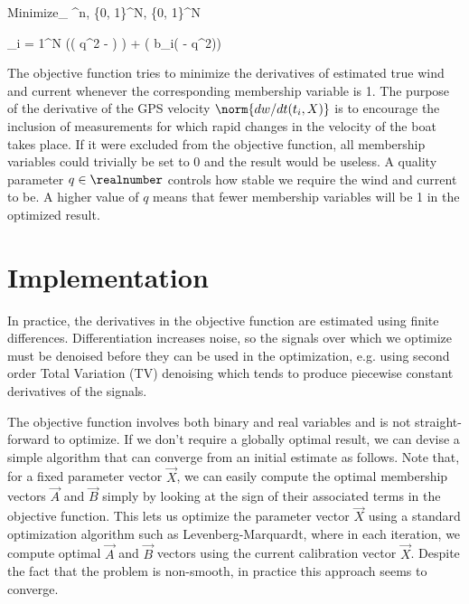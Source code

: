 Minimize_{ \in \realnumber^n,  \in \{0, 1\}^N,  \in \{0, 1\}^N}

\sum_{i = 1}^N \left(\left(  q^2 -   \right) \right) 
+ \left( b_i\left(  - q^2\right)\right)

The objective function tries to minimize the derivatives of estimated true wind and current whenever the corresponding membership variable is 1. The purpose of the derivative of the GPS velocity $\norm{dw/dt(t_i, X)}$ is to encourage the inclusion of measurements for which rapid changes in the velocity of the boat takes place. If it were excluded from the objective function, all membership variables could trivially be set to 0 and the result would be useless. A quality parameter $q \in \realnumber$ controls how stable we require the wind and current to be. A higher value of $q$ means that fewer membership variables will be 1 in the optimized result.

\section{Implementation}
In practice, the derivatives in the objective function are estimated using finite differences. Differentiation increases noise, so the signals over which we optimize must be denoised before they can be used in the optimization, e.g. using second order Total Variation (TV) denoising which tends to produce piecewise constant derivatives of the signals.

The objective function involves both binary and real variables and is not straight-forward to optimize. If we don't require a globally optimal result, we can devise a simple algorithm that can converge from an initial estimate as follows. Note that, for a fixed parameter vector $\vec{X}$, we can easily compute the optimal membership vectors $\vec{A}$ and $\vec{B}$ simply by looking at the sign of their associated terms in the objective function. This lets us optimize the parameter vector $\vec{X}$ using a standard optimization algorithm such as Levenberg-Marquardt, where in each iteration, we compute optimal $\vec{A}$ and $\vec{B}$ vectors using the current calibration vector $\vec{X}$. Despite the fact that the problem is non-smooth, in practice this approach seems to converge.
